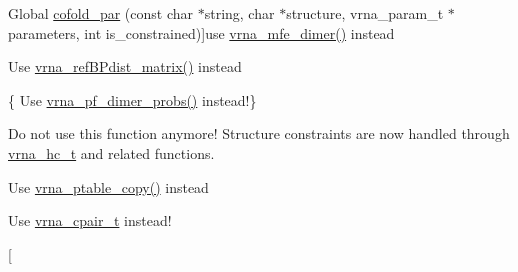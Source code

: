 \begin{DoxyRefList}
Global \hyperlink{group__mfe__cofold_ga7612cfeeb1b793f1e4179b1eb53df1f3}{cofold\+\_\+par} (const char $\ast$string, char $\ast$structure, vrna\+\_\+param\+\_\+t $\ast$parameters, int is\+\_\+constrained)]use \hyperlink{group__mfe__cofold_gaab22d10c1190f205f16a77cab9d5d3ee}{vrna\+\_\+mfe\+\_\+dimer()} instead 
\item[\label{deprecated__deprecated000138}%
\hypertarget{deprecated__deprecated000138}{}%
Global \hyperlink{group__struct__utils_gadd463184355d0803b6ee6e09f29182f2}{compute\+\_\+\+B\+Pdifferences} (short $\ast$pt1, short $\ast$pt2, unsigned int turn)]Use \hyperlink{group__struct__utils_ga5a27bd058183170afd4716f5b8ff511a}{vrna\+\_\+ref\+B\+Pdist\+\_\+matrix()} instead  
\item[\label{deprecated__deprecated000112}%
\hypertarget{deprecated__deprecated000112}{}%
Global \hyperlink{part__func__co_8h_a21f8f4a97f904d5d805d571081b2f5f9}{compute\+\_\+probabilities} (double F\+A\+B, double F\+E\+A, double F\+E\+B, vrna\+\_\+plist\+\_\+t $\ast$pr\+A\+B, vrna\+\_\+plist\+\_\+t $\ast$pr\+A, vrna\+\_\+plist\+\_\+t $\ast$pr\+B, int Alength)]\{ Use \hyperlink{group__pf__cofold_gaf04708a63d2385d5959db9f886741479}{vrna\+\_\+pf\+\_\+dimer\+\_\+probs()} instead!\} 
\item[\label{deprecated__deprecated000041}%
\hypertarget{deprecated__deprecated000041}{}%
Global \hyperlink{constraints_8h_a36c3a6c3218b041f992052767bc74549}{constrain\+\_\+ptypes} (const char $\ast$constraint, unsigned int length, char $\ast$ptype, int $\ast$\+B\+P, int min\+\_\+loop\+\_\+size, unsigned int idx\+\_\+type)]Do not use this function anymore! Structure constraints are now handled through \hyperlink{group__constraints_gac7e4c4f8abe3163a68110c5bff24e01d}{vrna\+\_\+hc\+\_\+t} and related functions. 
\item[\label{deprecated__deprecated000133}%
\hypertarget{deprecated__deprecated000133}{}%
Global \hyperlink{group__struct__utils_gafeaa6d68eef3a99d0a7aa08aa91c6601}{copy\+\_\+pair\+\_\+table} (const short $\ast$pt)]Use \hyperlink{group__struct__utils_ga2daefbbd6d9f8803731651882f54332d}{vrna\+\_\+ptable\+\_\+copy()} instead 
\item[\label{deprecated__deprecated000044}%
\hypertarget{deprecated__deprecated000044}{}%
Global \hyperlink{group__data__structures_ga8412f116a2eb07b59ade9e14ca7c5ef1}{cpair} ]Use \hyperlink{group__data__structures_gae4fc91141cc69c6d8eaf1332cb991ecc}{vrna\+\_\+cpair\+\_\+t} instead!  
\item[\label{deprecated__deprecated000016}%
\hypertarget{deprecated__deprecated000016}{}%

\end{DoxyRefList}
